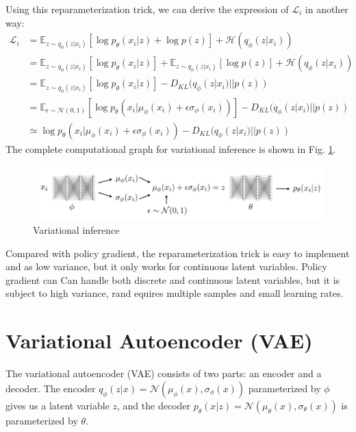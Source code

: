 Using this reparameterization trick, we can derive the expression of $\mathcal{L}_i$ in another way:
\begin{align*}
    \mathcal{L}_i &= \mathbb{E}_{z\sim q_\phi(z|x_i)}\left[\log p_\theta(x_i|z) + \log p(z)\right]+\mathcal{H}(q_\phi(z|x_i))\\
    &= \mathbb{E}_{z\sim q_\phi(z|x_i)}\left[\log p_\theta(x_i|z)\right] + \mathbb{E}_{z\sim q_\phi(z|x_i)}\left[\log p(z)\right] + \mathcal{H}(q_\phi(z|x_i))\\
    &=  \mathbb{E}_{z\sim q_\phi(z|x_i)}\left[\log p_\theta(x_i|z)\right] - D_{KL}(q_\phi(z|x_i)||p(z))\\
    &= \mathbb{E}_{\epsilon\sim \mathcal{N}(0,1)}\left[\log p_\theta(x_i|\mu_\phi(x_i)+\epsilon\sigma_\phi(x_i))\right] - D_{KL}(q_\phi(z|x_i)||p(z))\\
    &\simeq \log p_\theta( x_i|\mu_\phi(x_i)+\epsilon\sigma_\phi(x_i)) - D_{KL}(q_\phi(z|x_i)||p(z))
\end{align*}
The complete computational graph for variational inference is shown in Fig. \ref{fig:varinf}. 
\begin{figure}
    \centering
    \includegraphics[scale=0.4]{figures/varinf.png}
    \caption{Variational inference}
    \label{fig:varinf}
\end{figure}

Compared with policy gradient, the reparameterization trick is easy to implement and as low variance, but it only works for continuous latent variables. Policy gradient can Can handle both discrete and continuous latent variables, but it is subject to high variance, rand equires multiple samples and small learning rates.

\section{Variational Autoencoder (VAE)}
The variational autoencoder (VAE) consists of two parts: an encoder and a decoder. The encoder $q_\phi(z|x) = \mathcal{N}(\mu_\phi(x),\sigma_\phi(x))$ parameterized by $\phi$ gives us a latent variable $z$, and the decoder $p_\theta(x|z) = \mathcal{N}(\mu_\theta(x),\sigma_\theta(x))$ is parameterized by $\theta$.

